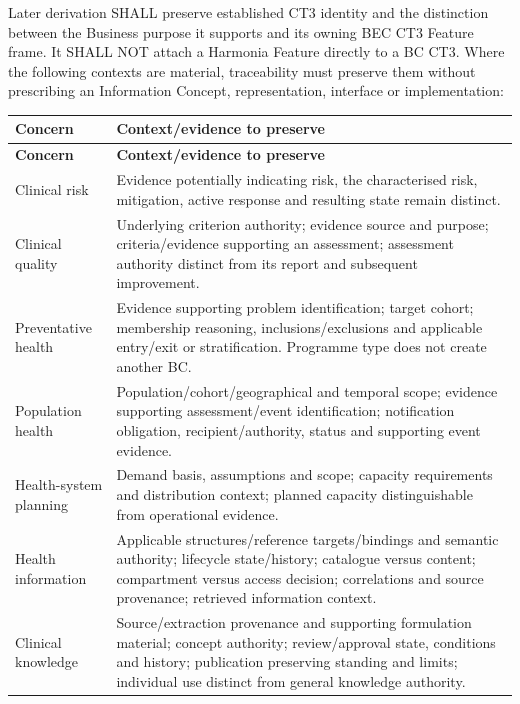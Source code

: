Later derivation SHALL preserve established CT3 identity and the distinction between the Business purpose it supports and its owning BEC CT3 Feature frame. It SHALL NOT attach a Harmonia Feature directly to a BC CT3. Where the following contexts are material, traceability must preserve them without prescribing an Information Concept, representation, interface or implementation:

\label{rad:business:1298}
\begingroup\small\setlength{\TableWidth}{\dimexpr\linewidth-4\tabcolsep-3\arrayrulewidth\relax}
\begin{longtable}{|>{\raggedright\arraybackslash}p{0.35\TableWidth}|>{\raggedright\arraybackslash}p{0.65\TableWidth}|}
\hline\rowcolor{TableHead}\textbf{Concern} & \textbf{Context/\allowbreak{}evidence to preserve}\\\hline\endfirsthead
\hline\rowcolor{TableHead}\textbf{Concern} & \textbf{Context/\allowbreak{}evidence to preserve}\\\hline\endhead
\hline\endfoot
Clinical risk & Evidence potentially indicating risk, the characterised risk, mitigation, active response and resulting state remain distinct.\\\hline
Clinical quality & Underlying criterion authority; evidence source and purpose; criteria/\allowbreak{}evidence supporting an assessment; assessment authority distinct from its report and subsequent improvement.\\\hline
Preventative health & Evidence supporting problem identification; target cohort; membership reasoning, inclusions/\allowbreak{}exclusions and applicable entry/\allowbreak{}exit or stratification. Programme type does not create another BC.\\\hline
Population health & Population/\allowbreak{}cohort/\allowbreak{}geographical and temporal scope; evidence supporting assessment/\allowbreak{}event identification; notification obligation, recipient/\allowbreak{}authority, status and supporting event evidence.\\\hline
Health-system planning & Demand basis, assumptions and scope; capacity requirements and distribution context; planned capacity distinguishable from operational evidence.\\\hline
Health information & Applicable structures/\allowbreak{}reference targets/\allowbreak{}bindings and semantic authority; lifecycle state/\allowbreak{}history; catalogue versus content; compartment versus access decision; correlations and source provenance; retrieved information context.\\\hline
Clinical knowledge & Source/\allowbreak{}extraction provenance and supporting formulation material; concept authority; review/\allowbreak{}approval state, conditions and history; publication preserving standing and limits; individual use distinct from general knowledge authority.\\\hline
\end{longtable}\endgroup
{}\label{rad:business:1308}

